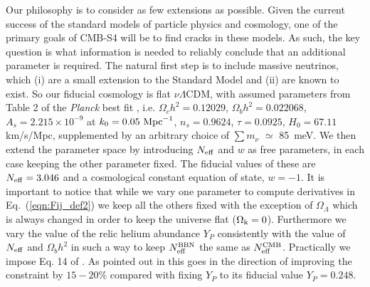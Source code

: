 \documentclass[aps,prd,reprint,superscriptaddress]{revtex4-1}
\newcommand\refeq[1]{Eq.~(\ref{eqn:#1})}
\begin{document}
Our philosophy is to consider as few extensions as possible. Given the current success of the standard models of particle physics and cosmology, one of the primary goals of CMB-S4 will be to find cracks in these models. As such, the key question is what information is needed to reliably conclude that an additional parameter is required. The natural first step is to include massive neutrinos, which (i) are a small extension to the Standard Model and (ii) are known to exist. So our fiducial cosmology is flat $\nu \Lambda$CDM, with assumed 
parameters from Table 2 of the \textit{Planck} best fit \cite{planck-collaboration:2014g}, i.e. $\Omega_c h^2 = 0.12029$, $\Omega_b h^2 = 0.022068$, $A_s = 2.215\times10^{-9}$ at $k_0 = 0.05\ {\rm Mpc}^{-1}$, $n_s = 0.9624$, $\tau = 0.0925$, $H_0 = 67.11$ km/s/Mpc, supplemented by an arbitrary choice of $\sum m_\nu$ $\simeq$ 85\ meV.  
We then extend the parameter space by introducing $N_{\rm eff}$ and $w$ as free parameters, in each case keeping the other parameter fixed.
The fiducial values of these are $N_{\rm eff}=3.046$ and a cosmological constant equation of state, $w=-1$.
It is important to notice that while we vary one parameter to compute derivatives in \refeq{Fij_def2} we keep all the others fixed with the exception of $\Omega_{\Lambda}$ which is always changed in order to keep the universe flat ($\Omega_{\rm k} = 0$). Furthermore we vary the value of the relic helium abundance $Y_{P}$ consistently with the value of $N_{\rm eff}$ and $\Omega_b h^2$ in such a way to keep $N_{\rm eff}^{\rm BBN}$ the same as $N_{\rm eff}^{\rm CMB}$\cite{1475-7516-2008-06-016}. Practically we impose Eq. 14 of \cite{wu:2014}. As pointed out in \cite{wu:2014} this goes in the direction of improving the constraint by $15-20\%$ compared with fixing $Y_{P}$ to its fiducial value $Y_{P}=0.248$.
\end{document}
